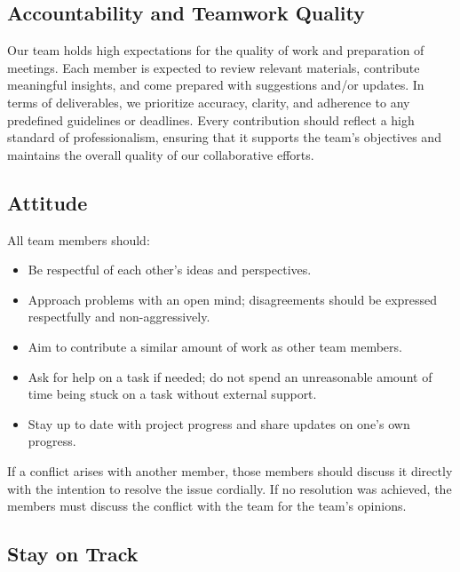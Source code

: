 \documentclass{article}
\begin{document}
\subsection{Accountability and Teamwork Quality}

Our team holds high expectations for the quality of work and preparation of meetings. Each member is expected to review relevant materials, contribute meaningful insights, and come prepared with suggestions and/or updates. In terms of deliverables, we prioritize accuracy, clarity, and adherence to any predefined guidelines or deadlines. Every contribution should reflect a high standard of professionalism, ensuring that it supports the team’s objectives and maintains the overall quality of our collaborative efforts.

\subsection{Attitude}

All team members should:

\begin{itemize}
    \item Be respectful of each other’s ideas and perspectives.
    \item Approach problems with an open mind; disagreements should be expressed respectfully and non-aggressively.
    \item Aim to contribute a similar amount of work as other team members.
    \item Ask for help on a task if needed; do not spend an unreasonable amount of time being stuck on a task without external support.
    \item Stay up to date with project progress and share updates on one’s own progress.
\end{itemize}

If a conflict arises with another member, those members should discuss it directly with the intention to resolve the issue cordially. If no resolution was achieved, the members must discuss the conflict with the team for the team’s opinions.

\subsection{Stay on Track}
\end{document}
